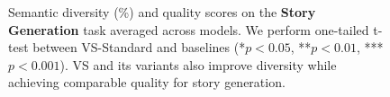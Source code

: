 \begin{figure}[!htbp]
\begin{subfigure}[t]{0.48\textwidth}
      \label{fig:story_creative_quality}
  \end{subfigure}
  \caption{
  Semantic diversity (\%) and quality scores on the \textbf{Story Generation} task averaged across models. We perform one-tailed t-test between VS-Standard and baselines (*$p < 0.05$, **$p < 0.01$, ***$p < 0.001$). VS and its variants also improve diversity while achieving comparable quality for story generation.
  }
  \label{fig:poem_continuation}
\end{figure}



